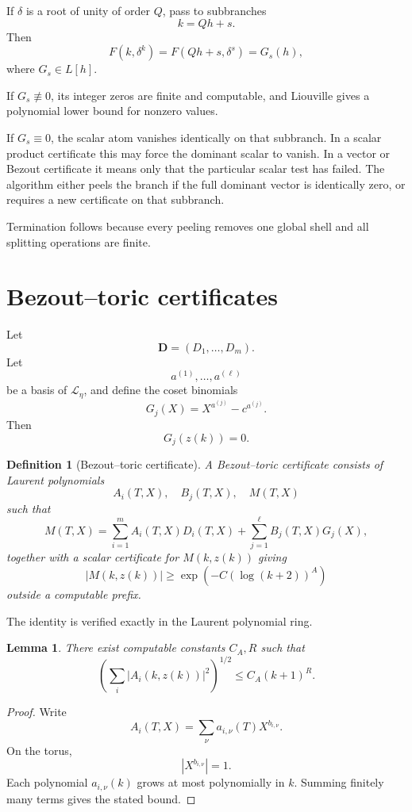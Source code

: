 \documentclass[11pt]{article}
\newtheorem{lemma}[theorem]{Lemma}
\newtheorem{definition}[theorem]{Definition}
\begin{document}
If \(\delta\) is a root of unity of order \(Q\), pass to subbranches
\[
k=Qh+s.
\]
Then
\[
F(k,\delta^k)=F(Qh+s,\delta^s)=G_s(h),
\]
where \(G_s\in L[h]\).

If \(G_s\not\equiv0\), its integer zeros are finite and computable, and Liouville gives a polynomial lower bound for nonzero values.

If \(G_s\equiv0\), the scalar atom vanishes identically on that subbranch. In a scalar product certificate this may force the dominant scalar to vanish. In a vector or Bezout certificate it means only that the particular scalar test has failed. The algorithm either peels the branch if the full dominant vector is identically zero, or requires a new certificate on that subbranch.

Termination follows because every peeling removes one global shell and all splitting operations are finite.

\section{Bezout--toric certificates}

Let
\[
\mathbf D=(D_1,\ldots,D_m).
\]
Let
\[
a^{(1)},\ldots,a^{(\ell)}
\]
be a basis of \(\mathcal L_\eta\), and define the coset binomials
\[
G_j(X)=X^{a^{(j)}}-c^{a^{(j)}}.
\]
Then
\[
G_j(z(k))=0.
\]

\begin{definition}[Bezout--toric certificate]
A Bezout--toric certificate consists of Laurent polynomials
\[
A_i(T,X),\quad B_j(T,X),\quad M(T,X)
\]
such that
\[
M(T,X)=\sum_{i=1}^m A_i(T,X)D_i(T,X)+\sum_{j=1}^\ell B_j(T,X)G_j(X),
\]
together with a scalar certificate for \(M(k,z(k))\) giving
\[
|M(k,z(k))|\ge \exp(-C(\log(k+2))^A)
\]
outside a computable prefix.
\end{definition}

The identity is verified exactly in the Laurent polynomial ring.

\begin{lemma}
There exist computable constants \(C_A,R\) such that
\[
\left(\sum_i|A_i(k,z(k))|^2\right)^{1/2}
\le C_A(k+1)^R.
\]
\end{lemma}

\begin{proof}
Write
\[
A_i(T,X)=\sum_\nu a_{i,\nu}(T)X^{b_{i,\nu}}.
\]
On the torus,
\[
|X^{b_{i,\nu}}|=1.
\]
Each polynomial \(a_{i,\nu}(k)\) grows at most polynomially in \(k\). Summing finitely many terms gives the stated bound.
\end{proof}
\end{document}
